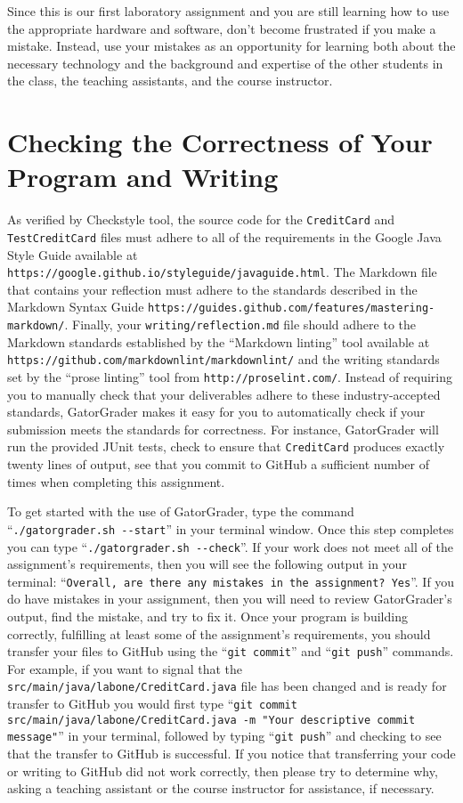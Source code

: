 \documentclass[11pt]{article}
\newcommand{\mainprogram}{\lstinline{CreditCard}}
\newcommand{\mainprogramsource}{\lstinline{src/main/java/labone/CreditCard.java}}
\newcommand{\testprogram}{\lstinline{TestCreditCard}}
\newcommand{\reflection}{\lstinline{writing/reflection.md}}
\newcommand{\gatorgraderstart}{\command{./gatorgrader.sh --start}}
\newcommand{\gatorgradercheck}{\command{./gatorgrader.sh --check}}
\newcommand{\gitcommit}{\command{git commit}}
\newcommand{\gitpush}{\command{git push}}
\newcommand{\gitcommitmainprogram}{\command{git commit src/main/java/labone/CreditCard.java -m "Your
descriptive commit message"}}
\newcommand{\command}[1]{``\lstinline{#1}''}
\newcommand{\url}[1]{\lstinline{#1}}
\newcommand{\step}[1]{``{#1}''}
\begin{document}
Since this is our first laboratory assignment and you are still learning how to use the appropriate hardware and
software, don't become frustrated if you make a mistake. Instead, use your mistakes as an opportunity for learning both
about the necessary technology and the background and expertise of the other students in the class, the teaching
assistants, and the course instructor.

\section*{Checking the Correctness of Your Program and Writing}

As verified by Checkstyle tool, the source code for the \mainprogram{} and \testprogram{} files must adhere to all of
the requirements in the Google Java Style Guide available at \url{https://google.github.io/styleguide/javaguide.html}.
The Markdown file that contains your reflection must adhere to the standards described in the Markdown Syntax Guide
\url{https://guides.github.com/features/mastering-markdown/}. Finally, your \reflection{} file should adhere to the
Markdown standards established by the \step{Markdown linting} tool available at
\url{https://github.com/markdownlint/markdownlint/} and the writing standards set by the \step{prose linting} tool from
\url{http://proselint.com/}. Instead of requiring you to manually check that your deliverables adhere to these
industry-accepted standards, GatorGrader makes it easy for you to automatically check if your submission meets the
standards for correctness. For instance, GatorGrader will run the provided JUnit tests, check to ensure that
\mainprogram{} produces exactly twenty lines of output, see that you commit to GitHub a sufficient number of times when
completing this assignment.

To get started with the use of GatorGrader, type the command \gatorgraderstart{} in your terminal window. Once this step
completes you can type \gatorgradercheck{}. If your work does not meet all of the assignment's requirements, then you
will see the following output in your terminal: \command{Overall, are there any mistakes in the assignment? Yes}. If you
do have mistakes in your assignment, then you will need to review GatorGrader's output, find the mistake, and try to fix
it. Once your program is building correctly, fulfilling at least some of the assignment's requirements, you should
transfer your files to GitHub using the \gitcommit{} and \gitpush{} commands. For example, if you want to signal that
the \mainprogramsource{} file has been changed and is ready for transfer to GitHub you would first type
\gitcommitmainprogram{} in your terminal, followed by typing \gitpush{} and checking to see that the transfer to GitHub
is successful. If you notice that transferring your code or writing to GitHub did not work correctly, then please try to
determine why, asking a teaching assistant or the course instructor for assistance, if necessary.
\end{document}
